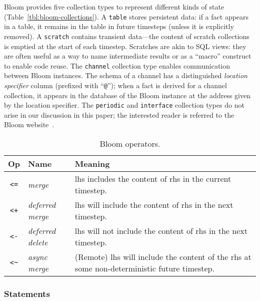 Bloom provides five collection types to represent different kinds of state
(Table~\ref{tbl:bloom-collections}). A \texttt{table} stores persistent data: if
a fact appears in a table, it remains in the table in future timesteps (unless it
is explicitly removed). A \texttt{scratch} contains transient data---the content
of scratch collections is emptied at the start of each timestep. Scratches are
akin to SQL views: they are often useful as a way to name intermediate results
or as a ``macro'' construct to enable code reuse. The \texttt{channel}
collection type enables communication between Bloom instances. The schema of a
channel has a distinguished \emph{location specifier} column (prefixed with
``\texttt{@}''); when a fact is derived for a channel collection, it appears in
the database of the Bloom instance at the address given by the location
specifier. The \texttt{periodic} and \texttt{interface} collection types do not
arise in our discussion in this paper; the interested reader is referred to the
Bloom website~\cite{bloom}.

\begin{table}[t]
\centering
\begin{tabular}{|c|l|p{1.85in}|}
\hline
\textbf{Op} & \textbf{Name} & \textbf{Meaning} \\
\hline
\verb|<=| & \emph{merge} & lhs includes the content of rhs in the
current timestep. \\
\hline
\verb|<+| & \emph{deferred merge} & lhs will include the content of rhs in the
next timestep. \\
\hline
\verb|<-| & \emph{deferred delete} & lhs will not include the content of rhs
in the next timestep. \\
\hline
\verb|<~| & \emph{async merge} & (Remote) lhs will include the content of the
rhs at some non-deterministic future timestep. \\
\hline
\end{tabular}
\caption{Bloom operators.}
\label{tbl:bloom-ops}
\end{table}

\subsubsection{Statements}

